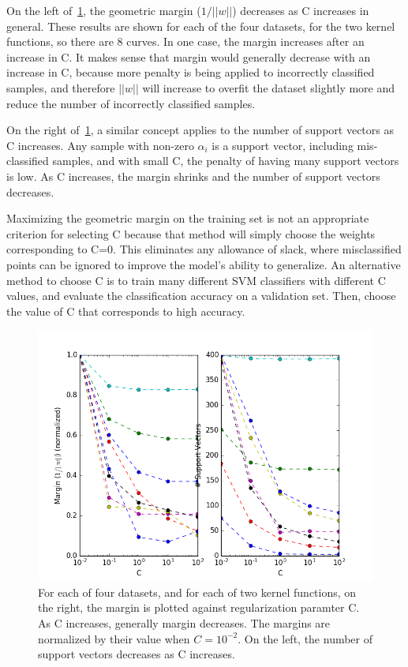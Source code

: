 On the left of~\cref{fig:2_3_margin_sv}, the geometric margin ($1/||w||$) decreases as C increases in general.
These results are shown for each of the four datasets, for the two kernel functions, so there are 8 curves.
In one case, the margin increases after an increase in C.
It makes sense that margin would generally decrease with an increase in C, because more penalty is being applied to incorrectly classified samples, and therefore $||w||$ will increase to overfit the dataset slightly more and reduce the number of incorrectly classified samples.

On the right of~\cref{fig:2_3_margin_sv}, a similar concept applies to the number of support vectors as C increases.
Any sample with non-zero $\alpha_i$ is a support vector, including mis-classified samples, and with small C, the penalty of having many support vectors is low. As C increases, the margin shrinks and the number of support vectors decreases.

Maximizing the geometric margin on the training set is not an appropriate criterion for selecting C because that method will simply choose the weights corresponding to C=0.
This eliminates any allowance of slack, where misclassified points can be ignored to improve the model's ability to generalize.
An alternative method to choose C is to train many different SVM classifiers with different C values, and evaluate the classification accuracy on a validation set.
Then, choose the value of C that corresponds to high accuracy.


\begin{figure}
	\centering
	\includegraphics [trim=0 0 0 0, clip, angle=0, width=0.8\columnwidth,
	keepaspectratio]{figures/2_3_margin_sv}
	\caption{For each of four datasets, and for each of two kernel functions, on the right, the margin is plotted against regularization paramter C. As C increases, generally margin decreases. The margins are normalized by their value when $C=10^{-2}$. On the left, the number of support vectors decreases as C increases.}
	\label{fig:2_3_margin_sv} 
\end{figure}


